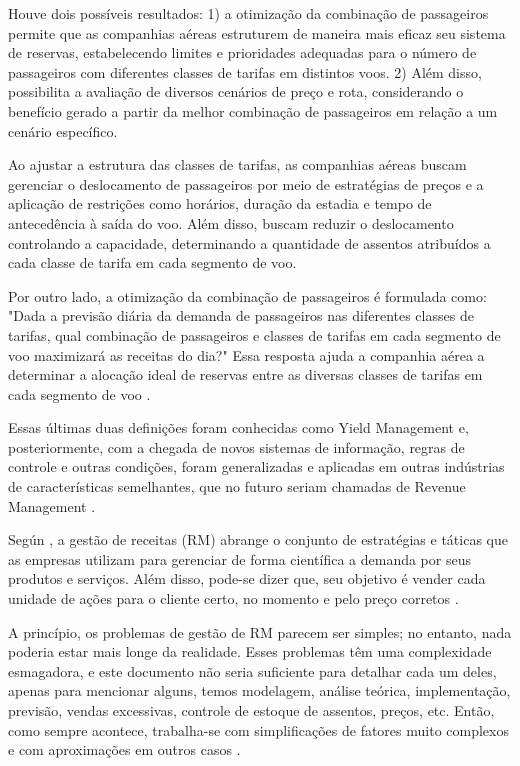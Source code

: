 Houve dois possíveis resultados: 1) a otimização da combinação de passageiros permite que as companhias aéreas estruturem de maneira mais eficaz seu sistema de reservas, estabelecendo limites e prioridades adequadas para o número de passageiros com diferentes classes de tarifas em distintos voos. 2) Além disso, possibilita a avaliação de diversos cenários de preço e rota, considerando o benefício gerado a partir da melhor combinação de passageiros em relação a um cenário específico.

Ao ajustar a estrutura das classes de tarifas, as companhias aéreas buscam gerenciar o deslocamento de passageiros por meio de estratégias de preços e a aplicação de restrições como horários, duração da estadia e tempo de antecedência à saída do voo. Além disso, buscam reduzir o deslocamento controlando a capacidade, determinando a quantidade de assentos atribuídos a cada classe de tarifa em cada segmento de voo.

Por outro lado, a otimização da combinação de passageiros é formulada como: "Dada a previsão diária da demanda de passageiros nas diferentes classes de tarifas, qual combinação de passageiros e classes de tarifas em cada segmento de voo maximizará as receitas do dia?" Essa resposta ajuda a companhia aérea a determinar a alocação ideal de reservas entre as diversas classes de tarifas em cada segmento de voo \cite{article_base}. 

Essas últimas duas definições foram conhecidas como Yield Management e, posteriormente, com a chegada de novos sistemas de informação, regras de controle e outras condições, foram generalizadas e aplicadas em outras indústrias de características semelhantes, que no futuro seriam chamadas de Revenue Management \cite{article_YM_to_RM}.

Según \cite{article_Ryzin2014}, a gestão de receitas (RM) abrange o conjunto de estratégias e táticas que as empresas utilizam para gerenciar de forma científica a demanda por seus produtos e serviços. Além disso, pode-se dizer que, seu objetivo é vender cada unidade de ações para o cliente certo, no momento e pelo preço corretos \cite{doi:10.1080/02642069.2010.491543}.

A princípio, os problemas de gestão de RM parecem ser simples; no entanto, nada poderia estar mais longe da realidade. Esses problemas têm uma complexidade esmagadora, e este documento não seria suficiente para detalhar cada um deles, apenas para mencionar alguns, temos modelagem, análise teórica, implementação, previsão, vendas excessivas, controle de estoque de assentos, preços, etc. Então, como sempre acontece, trabalha-se com simplificações de fatores muito complexos e com aproximações em outros casos \cite{doi:10.1287/trsc.33.2.233}.


